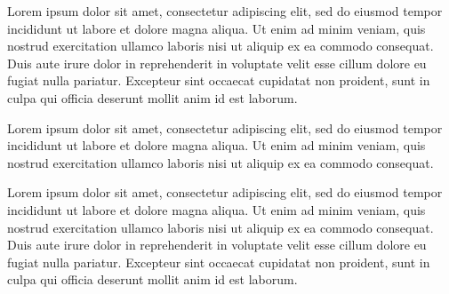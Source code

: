 \documentclass[ijgi,article,submit,moreauthors,pdftex,10pt,a4paper]{Definitions/mdpi}
\begin{document}
Lorem ipsum dolor sit amet, consectetur adipiscing elit, sed do eiusmod tempor incididunt ut labore et dolore magna aliqua. Ut enim ad minim veniam, quis nostrud exercitation ullamco laboris nisi ut aliquip ex ea commodo consequat. Duis aute irure dolor in reprehenderit in voluptate velit esse cillum dolore eu fugiat nulla pariatur. Excepteur sint occaecat cupidatat non proident, sunt in culpa qui officia deserunt mollit anim id est laborum.

Lorem ipsum dolor sit amet, consectetur adipiscing elit, sed do eiusmod tempor incididunt ut labore et dolore magna aliqua. Ut enim ad minim veniam, quis nostrud exercitation ullamco laboris nisi ut aliquip ex ea commodo consequat.

Lorem ipsum dolor sit amet, consectetur adipiscing elit, sed do eiusmod tempor incididunt ut labore et dolore magna aliqua. Ut enim ad minim veniam, quis nostrud exercitation ullamco laboris nisi ut aliquip ex ea commodo consequat. Duis aute irure dolor in reprehenderit in voluptate velit esse cillum dolore eu fugiat nulla pariatur. Excepteur sint occaecat cupidatat non proident, sunt in culpa qui officia deserunt mollit anim id est laborum.





\end{document}
